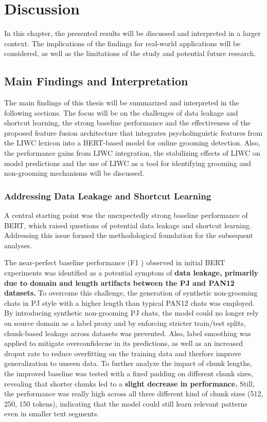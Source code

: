 \chapter{Discussion}
In this chapter, the presented results will be discussed and interpreted in a larger context. The implications of the findings for real-world applications will be considered, as well as the limitations of the study and potential future research. 


\section{Main Findings and Interpretation}

The main findings of this thesis will be summarized and interpreted in the following sections. The focus will be on the challenges of data leakage and shortcut learning, the strong baseline performance and the effectiveness of the proposed feature fusion architecture that integrates psycholinguistic features from the LIWC lexicon into a BERT-based model for online grooming detection.  Also, the performance gains from LIWC integration, the stabilizing effects of LIWC on model predictions and the use of LIWC as a tool for identifying grooming and non-grooming mechanisms will be discussed. 



\subsection{Addressing Data Leakage and Shortcut Learning}
A central starting point was the unexpectedly strong baseline performance of BERT, which raised questions of potential data leakage and shortcut learning. Addressing this issue formed the methodological foundation for the subsequent analyses.

The near-perfect baseline performance (F1 ) observed in initial BERT experiments was identified as a potential symptom of \textbf{data leakage, primarily due to domain and length artifacts between the PJ and PAN12 datasets.} To overcome this challenge, the generation of synthetic non-grooming chats in PJ style with a higher length than typical PAN12 chats was employed. By introducing synthetic non-grooming PJ chats, the model could no longer rely on source domain as a label proxy and by enforcing stricter train/test splits, chunk-based leakage across datasets was prevented. Also, label smoothing was applied to mitigate overconfidecne in its predictions, as well as an increased droput rate to reduce overfitting on the training data and therfore improve generalization to unseen data. To further analyze the impact of chunk lengths, the improved baseline was tested with a fixed padding on different chunk sizes, revealing that shorter chunks led to a \textbf{slight decrease in performance.} Still, the performance was really high across all three different kind of chunk sizes (512, 250, 150 tokens), indicating that the model could still learn relevant patterns even in smaller text segments. 


